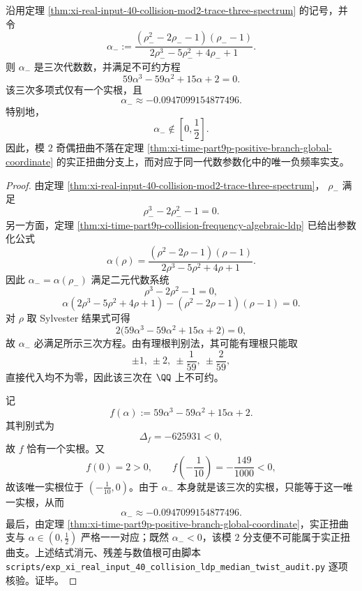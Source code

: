 \begin{theorem}\label{thm:xi-real-input-40-collision-mod2-negative-frequency-branch}
沿用定理 \ref{thm:xi-real-input-40-collision-mod2-trace-three-spectrum} 的记号，并令
\[
\alpha_-:=
\frac{(\rho_-^2-2\rho_--1)(\rho_--1)}
{2\rho_-^3-5\rho_-^2+4\rho_-+1}.
\]
则 \(\alpha_-\) 是三次代数数，并满足不可约方程
\[
\boxed{\;
59\alpha^3-59\alpha^2+15\alpha+2=0.\;}
\]
该三次多项式仅有一个实根，且
\[
\alpha_-\approx -0.0947099154877496.
\]
特别地，
\[
\alpha_-\notin \left[0,\frac12\right].
\]
因此，模 \(2\) 奇偶扭曲不落在定理 \ref{thm:xi-time-part9p-positive-branch-global-coordinate} 的实正扭曲分支上，而对应于同一代数参数化中的唯一负频率实支。
\end{theorem}
\begin{proof}
由定理 \ref{thm:xi-real-input-40-collision-mod2-trace-three-spectrum}，
\(\rho_-\) 满足
\[
\rho_-^3-2\rho_-^2-1=0.
\]
另一方面，定理 \ref{thm:xi-time-part9p-collision-frequency-algebraic-ldp} 已给出参数化公式
\[
\alpha(\rho)=
\frac{(\rho^2-2\rho-1)(\rho-1)}
{2\rho^3-5\rho^2+4\rho+1}.
\]
因此 \(\alpha_-=\alpha(\rho_-)\) 满足二元代数系统
\[
\rho^3-2\rho^2-1=0,
\]
\[
\alpha(2\rho^3-5\rho^2+4\rho+1)-(\rho^2-2\rho-1)(\rho-1)=0.
\]
对 \(\rho\) 取 Sylvester 结果式可得
\[
2\bigl(59\alpha^3-59\alpha^2+15\alpha+2\bigr)=0,
\]
故 \(\alpha_-\) 必满足所示三次方程。由有理根判别法，其可能有理根只能取
\[
\pm 1,\ \pm 2,\ \pm \frac{1}{59},\ \pm \frac{2}{59},
\]
直接代入均不为零，因此该三次在 \(\QQ\) 上不可约。

记
\[
f(\alpha):=59\alpha^3-59\alpha^2+15\alpha+2.
\]
其判别式为
\[
\Delta_f=-625931<0,
\]
故 \(f\) 恰有一个实根。又
\[
f(0)=2>0,
\qquad
f\!\left(-\frac{1}{10}\right)=-\frac{149}{1000}<0,
\]
故该唯一实根位于 \((-\tfrac{1}{10},0)\)。由于 \(\alpha_-\) 本身就是该三次的实根，只能等于这一唯一实根，从而
\[
\alpha_-\approx -0.0947099154877496.
\]
最后，由定理 \ref{thm:xi-time-part9p-positive-branch-global-coordinate}，实正扭曲支与 \(\alpha\in(0,\tfrac12)\) 严格一一对应；既然 \(\alpha_-<0\)，该模 \(2\) 分支便不可能属于实正扭曲支。上述结式消元、残差与数值根可由脚本 \texttt{scripts/exp\_xi\_real\_input\_40\_collision\_ldp\_median\_twist\_audit.py} 逐项核验。证毕。
\end{proof}

